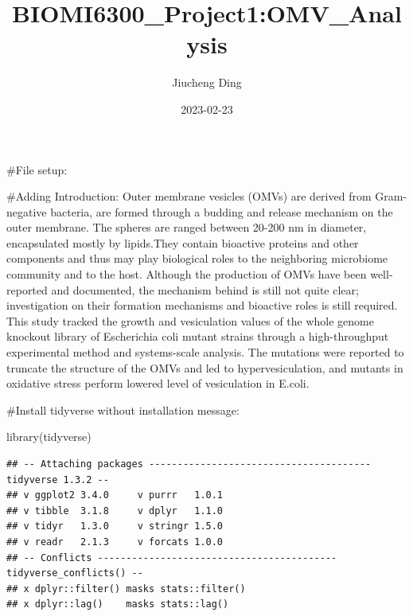 \documentclass[
]{article}
\title{BIOMI6300\_Project1:OMV\_Analysis}
\author{Jiucheng Ding}
\date{2023-02-23}
\newenvironment{Shaded}{\begin{snugshade}}{\end{snugshade}}
\newcommand{\AttributeTok}[1]{\textcolor[rgb]{0.77,0.63,0.00}{#1}}
\newcommand{\ConstantTok}[1]{\textcolor[rgb]{0.00,0.00,0.00}{#1}}
\newcommand{\FunctionTok}[1]{\textcolor[rgb]{0.00,0.00,0.00}{#1}}
\newcommand{\NormalTok}[1]{#1}
\newcommand{\SpecialCharTok}[1]{\textcolor[rgb]{0.00,0.00,0.00}{#1}}
\begin{document}
\maketitle

\#File setup:

\begin{Shaded}
\end{Shaded}

\#Adding Introduction: Outer membrane vesicles (OMVs) are derived from
Gram-negative bacteria, are formed through a budding and release
mechanism on the outer membrane. The spheres are ranged between 20-200
nm in diameter, encapsulated mostly by lipids.They contain bioactive
proteins and other components and thus may play biological roles to the
neighboring microbiome community and to the host. Although the
production of OMVs have been well-reported and documented, the mechanism
behind is still not quite clear; investigation on their formation
mechanisms and bioactive roles is still required. This study tracked the
growth and vesiculation values of the whole genome knockout library of
Escherichia coli mutant strains through a high-throughput experimental
method and systems-scale analysis. The mutations were reported to
truncate the structure of the OMVs and led to hypervesiculation, and
mutants in oxidative stress perform lowered level of vesiculation in
E.coli.

\#Install tidyverse without installation message:

\begin{Shaded}
\begin{Highlighting}[]
\FunctionTok{library}\NormalTok{(tidyverse)}
\end{Highlighting}
\end{Shaded}

\begin{verbatim}
## -- Attaching packages --------------------------------------- tidyverse 1.3.2 --
## v ggplot2 3.4.0     v purrr   1.0.1
## v tibble  3.1.8     v dplyr   1.1.0
## v tidyr   1.3.0     v stringr 1.5.0
## v readr   2.1.3     v forcats 1.0.0
## -- Conflicts ------------------------------------------ tidyverse_conflicts() --
## x dplyr::filter() masks stats::filter()
## x dplyr::lag()    masks stats::lag()
\end{verbatim}
\end{document}
